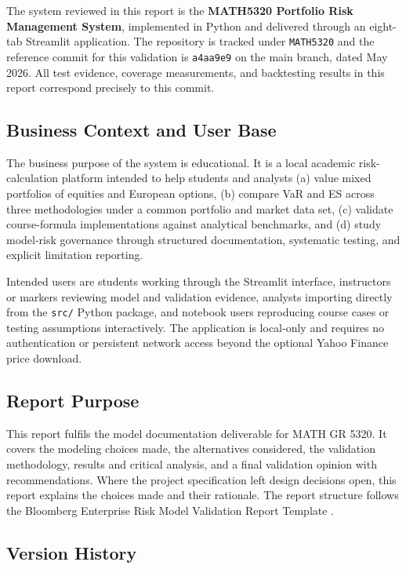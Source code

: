 \documentclass[11pt]{article}
\newcommand{\code}[1]{\texttt{#1}}
\begin{document}
The system reviewed in this report is the \textbf{MATH5320 Portfolio Risk
Management System}, implemented in Python and delivered through an eight-tab
Streamlit application.  The repository is tracked under \code{MATH5320} and
the reference commit for this validation is \code{a4aa9e9} on the main branch,
dated May 2026.  All test evidence, coverage measurements, and backtesting
results in this report correspond precisely to this commit.

\subsection{Business Context and User Base}

The business purpose of the system is educational.  It is a local academic
risk-calculation platform intended to help students and analysts (a) value
mixed portfolios of equities and European options, (b) compare VaR and ES
across three methodologies under a common portfolio and market data set, (c)
validate course-formula implementations against analytical benchmarks, and (d)
study model-risk governance through structured documentation, systematic
testing, and explicit limitation reporting.

Intended users are students working through the Streamlit interface, instructors
or markers reviewing model and validation evidence, analysts importing directly
from the \code{src/} Python package, and notebook users reproducing course
cases or testing assumptions interactively.  The application is local-only and
requires no authentication or persistent network access beyond the optional
Yahoo Finance price download.

\subsection{Report Purpose}

This report fulfils the model documentation deliverable for MATH GR 5320.
It covers the modeling choices made, the alternatives considered, the
validation methodology, results and critical analysis, and a final
validation opinion with recommendations.
Where the project specification left design decisions open, this report explains
the choices made and their rationale.  The report structure follows the
Bloomberg Enterprise Risk Model Validation Report Template \cite{stein2015template}.

\subsection{Version History}
\end{document}
